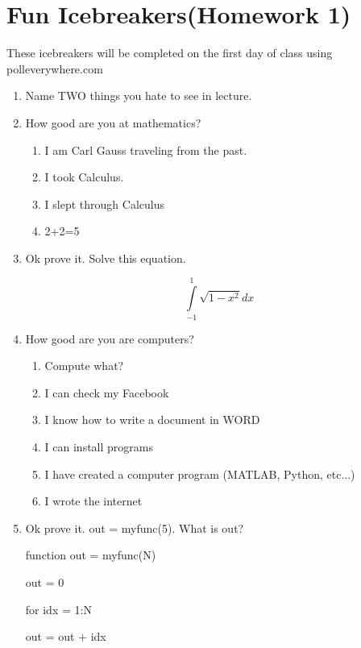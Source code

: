 
\section{Fun Icebreakers(Homework 1)} 

These icebreakers will be completed on the first day of class using
polleverywhere.com

\begin{enumerate}

\item Name TWO things you hate to see in lecture.


\item How good are you at mathematics?
  
  \begin{enumerate}
    \item I am Carl Gauss traveling from the past.
    \item I took Calculus.
    \item I slept through Calculus
    \item 2+2=5
  \end{enumerate}

\item Ok prove it. Solve this equation. 

  \begin{equation}\nonumber
    \int\limits_{-1}^1\sqrt{1-x^2}dx
  \end{equation}

\item How good are you are computers?

  \begin{enumerate}
    \item Compute what?
    \item I can check my Facebook
    \item I know how to write a document in WORD
    \item I can install programs
    \item I have created a computer program (MATLAB, Python, etc...)
    \item I wrote the internet
  \end{enumerate}

\item Ok prove it. out = myfunc(5). What is out?

function out = myfunc(N)

out = 0

for idx = 1:N

out = out + idx


\end{enumerate}

